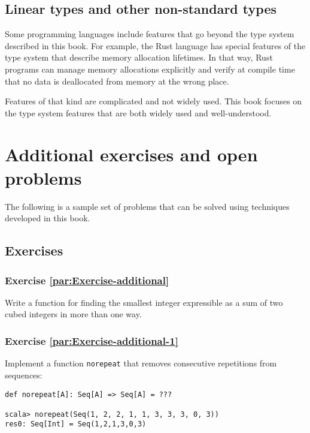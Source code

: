 \subsection{Linear types and other non-standard types}

Some programming languages include features that go beyond the type
system described in this book. For example, the Rust language has
special features of the type system that describe memory allocation
lifetimes. In that way, Rust programs can manage memory allocations
explicitly and verify at compile time that no data is deallocated
from memory at the wrong place.

Features of that kind are complicated and not widely used. This book
focuses on the type system features that are both widely used and
well-understood.

\section{Additional exercises and open problems\label{chap:Exercises-in-AFTT}}

The following is a sample set of problems that can be solved using
techniques developed in this book.

\subsection{Exercises}

\subsubsection{Exercise \label{par:Exercise-additional}\ref{par:Exercise-additional}}

Write a function for finding the smallest integer expressible as a
sum of two cubed integers in more than one way.

\subsubsection{Exercise \label{par:Exercise-additional-1}\ref{par:Exercise-additional-1}}

Implement a function \lstinline!norepeat! that removes consecutive
repetitions from sequences:
\begin{lstlisting}
def norepeat[A]: Seq[A] => Seq[A] = ???

scala> norepeat(Seq(1, 2, 2, 1, 1, 3, 3, 3, 0, 3))
res0: Seq[Int] = Seq(1,2,1,3,0,3)
\end{lstlisting}


